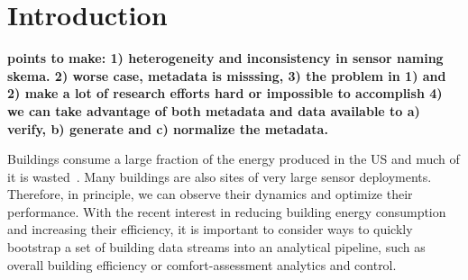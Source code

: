 \section{Introduction}




{\bf points to make: 1) heterogeneity and inconsistency in sensor naming skema. 2) worse case, metadata is misssing, 3) the problem in 1) and 2) make a lot of research efforts hard or impossible to accomplish 4) we can take advantage of both metadata and data available to a) verify, b) generate and c) normalize the metadata.}

Buildings consume a large fraction of the energy produced in the US and much of it is wasted~\cite{EIA, waste}.
Many buildings are also sites of very large sensor deployments.  Therefore, in principle, we can observe
their dynamics and optimize their performance.
With the recent interest in reducing building energy consumption and
increasing their efficiency, it
is important to consider ways to quickly bootstrap a set of building data streams
into an analytical pipeline, such as overall building efficiency or
comfort-assessment analytics and control.

